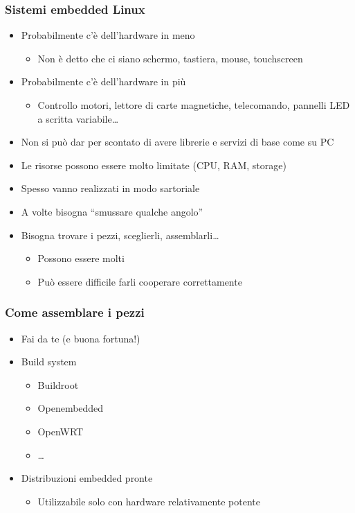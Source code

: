 \documentclass[xetex,table]{beamer}
\begin{document}
\begin{frame}
\frametitle{Sistemi embedded Linux}
  \begin{itemize}
  \item Probabilmente c'è dell'hardware in meno
    \begin{itemize}
    \item Non è detto che ci siano schermo, tastiera, mouse,
      touchscreen
    \end{itemize}
  \item Probabilmente c'è dell'hardware in più
    \begin{itemize}
    \item Controllo motori, lettore di carte magnetiche,
      telecomando, pannelli LED a scritta variabile\ldots
    \end{itemize}
  \item Non si può dar per scontato di avere librerie e servizi di
    base come su PC
  \item Le risorse possono essere molto limitate (CPU, RAM, storage)
  \item Spesso vanno realizzati in modo sartoriale
  \item A volte bisogna ``smussare qualche angolo''
  \item Bisogna trovare i pezzi, sceglierli, assemblarli\ldots
    \begin{itemize}
    \item Possono essere molti
    \item Può essere difficile farli cooperare correttamente
    \end{itemize}
  \end{itemize}
\end{frame}

\begin{frame}
\frametitle{Come assemblare i pezzi}
  \begin{itemize}
  \item Fai da te (e buona fortuna!)
  \item Build system
    \begin{itemize}
    \item Buildroot
    \item Openembedded
    \item OpenWRT
    \item \ldots
    \end{itemize}
  \item Distribuzioni embedded pronte
    \begin{itemize}
    \item Utilizzabile solo con hardware relativamente potente
    \end{itemize}
  \end{itemize}
\end{frame}
\end{document}
